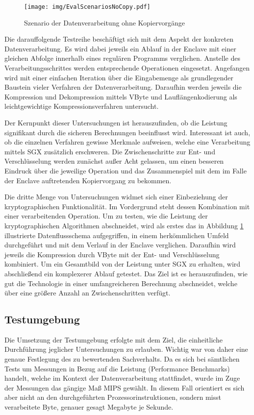 \begin{figure}[h]
	\texttt{[image: img/EvalScenariosNoCopy.pdf]}
	\centering
	\caption{Szenario der Datenverarbeitung ohne Kopiervorgänge}
	\label{fig:scenarionocopy}
\end{figure}

Die darauffolgende Testreihe beschäftigt sich mit dem Aspekt der konkreten Datenverarbeitung. Es wird dabei jeweils ein Ablauf in der Enclave mit einer gleichen Abfolge innerhalb eines regulären Programms verglichen. Anstelle des Verarbeitungsschrittes werden entsprechende Operationen eingesetzt. Angefangen wird mit einer einfachen Iteration über die Eingabemenge als grundlegender Baustein vieler Verfahren der Datenverarbeitung. Daraufhin werden jeweils die Kompression und Dekompression mittels VByte und Lauflängenkodierung als leichtgewichtige Kompressionsverfahren untersucht.

Der Kernpunkt dieser Untersuchungen ist herauszufinden, ob die Leistung signifikant durch die sicheren Berechnungen beeinflusst wird. Interessant ist auch, ob die einzelnen Verfahren gewisse Merkmale aufweisen, welche eine Verarbeitung mittels \ac{SGX} zusätzlich erschweren. Die Zwischenschritte zur Ent- und Verschlüsselung werden zunächst außer Acht gelassen, um einen besseren Eindruck über die jeweilige Operation und das Zusammenspiel mit dem im Falle der Enclave auftretenden Kopiervorgang zu bekommen.

Die dritte Menge von Untersuchungen widmet sich einer Einbeziehung der kryptographischen Funktionalität. Im Vordergrund steht dessen Kombination mit einer verarbeitenden Operation. Um zu testen, wie die Leistung der kryptographischen Algorithmen abschneidet, wird als erstes das in Abbildung \ref{fig:scenarionocopy} illustrierte Datenflussschema aufgegriffen, in einem herkömmlichen Umfeld durchgeführt und mit dem Verlauf in der Enclave verglichen. Daraufhin wird jeweils die Kompression durch VByte mit der Ent- und Verschlüsselung kombiniert. Um ein Gesamtbild von der Leistung unter \ac{SGX} zu erhalten, wird abschließend ein komplexerer Ablauf getestet. Das Ziel ist es herauszufinden, wie gut die Technologie in einer umfangreicheren Berechnung abschneidet, welche über eine größere Anzahl an Zwischenschritten verfügt.

\subsection{Testumgebung}

Die Umsetzung der Testumgebung erfolgte mit dem Ziel, die einheitliche Durchführung jeglicher Untersuchungen zu erlauben. Wichtig war von daher eine genaue Festlegung des zu bewertenden Sachverhalts. Da es sich bei sämtlichen Tests um Messungen in Bezug auf die Leistung (Performance Benchmarks) handelt, welche im Kontext der Datenverarbeitung stattfindet, wurde im Zuge der Messungen das gängige Maß \ac{MIPS} gewählt. In diesem Fall orientiert es sich aber nicht an den durchgeführten Prozessorinstruktionen, sondern misst verarbeitete Byte, genauer gesagt Megabyte je Sekunde.

